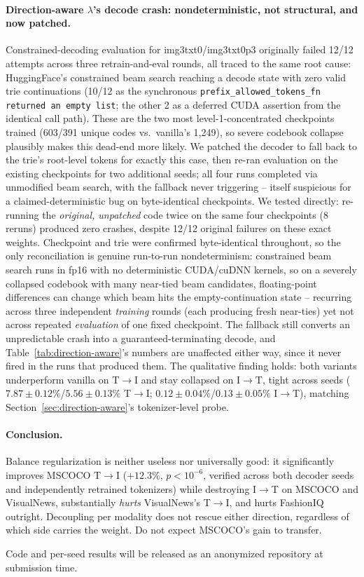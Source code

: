 \paragraph{Direction-aware $\lambda$'s decode crash: nondeterministic, not structural, and now patched.} Constrained-decoding evaluation for img3txt0/img3txt0p3 originally failed 12/12 attempts across three retrain-and-eval rounds, all traced to the same root cause: HuggingFace's constrained beam search reaching a decode state with zero valid trie continuations (10/12 as the synchronous \texttt{prefix\_allowed\_tokens\_fn returned an empty list}; the other 2 as a deferred CUDA assertion from the identical call path). These are the two most level-1-concentrated checkpoints trained (603/391 unique codes vs.\ vanilla's 1,249), so severe codebook collapse plausibly makes this dead-end more likely. We patched the decoder to fall back to the trie's root-level tokens for exactly this case, then re-ran evaluation on the existing checkpoints for two additional seeds; all four runs completed via unmodified beam search, with the fallback never triggering -- itself suspicious for a claimed-deterministic bug on byte-identical checkpoints. We tested directly: re-running the \emph{original, unpatched} code twice on the same four checkpoints (8 reruns) produced zero crashes, despite 12/12 original failures on these exact weights. Checkpoint and trie were confirmed byte-identical throughout, so the only reconciliation is genuine run-to-run nondeterminism: constrained beam search runs in fp16 with no deterministic CUDA/cuDNN kernels, so on a severely collapsed codebook with many near-tied beam candidates, floating-point differences can change which beam hits the empty-continuation state -- recurring across three independent \emph{training} rounds (each producing fresh near-ties) yet not across repeated \emph{evaluation} of one fixed checkpoint. The fallback still converts an unpredictable crash into a guaranteed-terminating decode, and Table~\ref{tab:direction-aware}'s numbers are unaffected either way, since it never fired in the runs that produced them. The qualitative finding holds: both variants underperform vanilla on T$\to$I and stay collapsed on I$\to$T, tight across seeds ($7.87\pm0.12\%$/$5.56\pm0.13\%$ T$\to$I; $0.12\pm0.04\%$/$0.13\pm0.05\%$ I$\to$T), matching Section~\ref{sec:direction-aware}'s tokenizer-level probe.

\paragraph{Conclusion.} Balance regularization is neither useless nor universally good: it significantly improves MSCOCO T$\to$I ($+12.3\%$, $p<10^{-6}$, verified across both decoder seeds and independently retrained tokenizers) while destroying I$\to$T on MSCOCO and VisualNews, substantially \emph{hurts} VisualNews's T$\to$I, and hurts FashionIQ outright. Decoupling per modality does not rescue either direction, regardless of which side carries the weight. Do not expect MSCOCO's gain to transfer.

Code and per-seed results will be released as an anonymized repository at submission time.
